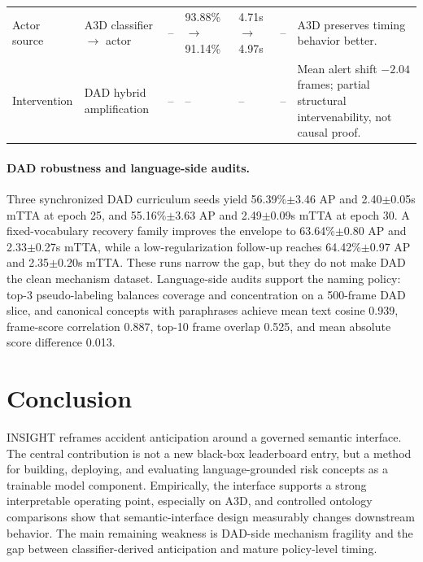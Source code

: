\documentclass[11pt]{article}
\newcommand{\method}{\textsc{INSIGHT}}
\begin{document}
\begin{table}[t]
\begin{tabular}{p{}p{}cp{}p{}p{}p{}}
Actor source & \makecell[l]{A3D classifier\\$\rightarrow$ actor} & -- & \makecell[l]{93.88\%\\$\rightarrow$91.14\%} & \makecell[l]{4.71s\\$\rightarrow$4.97s} & -- & A3D preserves timing behavior better. \\
Intervention & DAD hybrid amplification & -- & -- & -- & -- & Mean alert shift $-2.04$ frames; partial structural intervenability, not causal proof. \\
\bottomrule
\end{tabular}
\end{table}

\paragraph{DAD robustness and language-side audits.}
Three synchronized DAD curriculum seeds yield 56.39\%$\pm$3.46 AP and
2.40$\pm$0.05s mTTA at epoch 25, and 55.16\%$\pm$3.63 AP and
2.49$\pm$0.09s mTTA at epoch 30. A fixed-vocabulary recovery family improves
the envelope to 63.64\%$\pm$0.80 AP and 2.33$\pm$0.27s mTTA, while a
low-regularization follow-up reaches 64.42\%$\pm$0.97 AP and
2.35$\pm$0.20s mTTA. These runs narrow the gap, but they do not make DAD the
clean mechanism dataset. Language-side audits support the naming policy:
top-3 pseudo-labeling balances coverage and concentration on a 500-frame DAD
slice, and canonical concepts with paraphrases achieve mean text cosine 0.939,
frame-score correlation 0.887, top-10 frame overlap 0.525, and mean absolute
score difference 0.013.

\FloatBarrier
\section{Conclusion}

\method{} reframes accident anticipation around a governed semantic interface.
The central contribution is not a new black-box leaderboard entry, but a method
for building, deploying, and evaluating language-grounded risk concepts as a
trainable model component. Empirically, the interface supports a strong
interpretable operating point, especially on A3D, and controlled ontology
comparisons show that semantic-interface design measurably changes downstream
behavior. The main remaining weakness is DAD-side mechanism fragility and the
gap between classifier-derived anticipation and mature policy-level timing.
\end{document}
